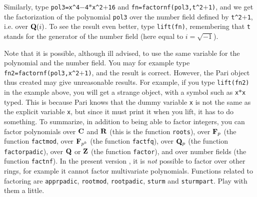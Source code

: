 Similarly, type {\tt pol3=x\^{}4$-$4$*$x\^{}2$+$16} and
{\tt fn=factornf(pol3,t\^{}2$+$1)}, and we get the factorization of the 
polynomial {\tt pol3} over the number field defined by {\tt t\^{}2$+$1},
i.e. over ${\bf Q}(i)$. To see the result even better, type {\tt lift(fn)},
remembering that {\tt t} stands for the generator of the number field
(here equal to $i=\sqrt{-1}$). 

Note that it is possible, although ill advised, to use the same variable
for the polynomial and the number field. You may for example type
{\tt fn2=factornf(pol3,x\^{}2$+$1)}, and the result is correct. However,
the Pari object thus created may give unreasonable results. For example,
if you type {\tt lift(fn2)} in the example above, you will get a strange
object, with a symbol such as {\tt x$*$x} typed. This is because
Pari knows that the dummy variable {\tt x} is not the same as the explicit
variable {\tt x}, but since it must print it when you lift, it has to
do something.
\smallskip
To summarize, in addition to being able to factor integers, you can
factor polynomials over ${\bf C}$ and ${\bf R}$ (this is the function {\tt roots}),
over ${\bf F}_p$ (the function {\tt factmod}, over ${\bf F}_{p^k}$ (the function
{\tt factfq}), over ${\bf Q}_p$ (the function {\tt factorpadic}), over ${\bf Q}$ or
${\bf Z}$ (the function {\tt factor}), and over number fields (the function
{\tt factnf}). In the present version \vers{}, it is {\it not} possible to
factor over other rings, for example it cannot factor multivariate polynomials.
\smallskip
Functions related to factoring are {\tt apprpadic}, {\tt rootmod}, 
{\tt rootpadic}, {\tt sturm} and {\tt sturmpart}. Play with them a little.

